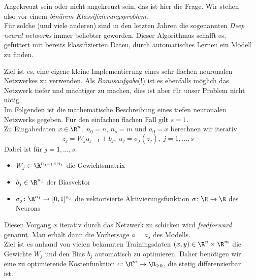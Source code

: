\vspace{-1.5em}

Angekreuzt sein oder nicht angekreuzt sein, das ist hier die Frage. 
Wir stehen also vor einem \emph{binärem Klassifizierungsproblem}.\\
Für solche (und viele anderen) sind in den letzten Jahren die sogenannten \emph{Deep neural networks} immer beliebter geworden. Dieser Algorithmus schafft es, gefüttert mit bereits klassifizierten Daten, durch automatisches Lernen ein Modell zu finden.


Ziel ist es, eine eigene kleine Implementierung eines sehr flachen neuronalen Netzwerkes zu verwenden. 
Als \emph{Bonusaufgabe}(!) ist es ebenfalls möglich das Netzwerk tiefer und mächtiger zu machen, dies ist aber für unser Problem nicht nötig.\\

Im Folgenden ist die mathematische Beschreibung eines tiefen neuronalen Netzwerks gegeben. Für den einfachen flachen Fall gilt $s=1$.\\
Zu Eingabedaten $x\in \R^n$, $n_0=n$, $n_s=m$ und $a_0=x$ berechnen wir iterativ 
$$z_j=W_ja_{j-1} + b_j,\;a_j=\sigma_j(z_j),\;j=1,\dots,s$$
Dabei ist für $j=1,\dots,s$:
\begin{itemize}
 \item $W_j \in \R^{n_{j-1}\times n_j}$ die Gewichtsmatrix
 \item $b_j \in \R^{n_j}$ der Biasvektor
 \item $\sigma_j \colon \R^{n_j} \to [0,1]^{n_j}$ die vektorisierte Aktivierungsfunktion $\sigma \colon \R \to \R$ des Neurons
\end{itemize}
Diesen Vorgang $x$ iterativ durch das Netzwerk zu schicken wird \emph{feedforward} genannt. Man erhält dann die Vorhersage $a=a_s$ des Modells.\\

Ziel ist es anhand von vielen bekannten Trainingsdaten $(x,y)\in \R^n \times \R^m$ die Gewichte $W_j$ und den Bias $b_j$ automatisch zu optimieren.
Daher benötigen wir eine zu optimierende Kostenfunktion $c\colon \R^m \to \R_{\ge 0}$, die stetig differenzierbar ist.\\
\\
\\
\\
